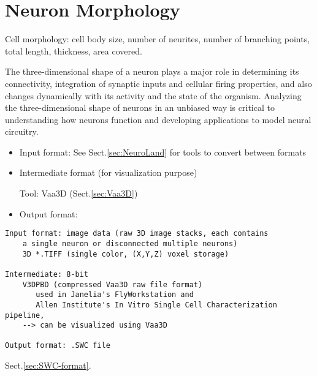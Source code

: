 \chapter{Neuron Morphology}
\label{chap:neuron-morphology}


Cell morphology: cell body size, number of neurites, number of branching
points, total length, thickness, area covered.

The three-dimensional shape of a neuron plays a major role in determining its
connectivity, integration of synaptic inputs and cellular firing properties, and
also changes dynamically with its activity and the state of the organism.
Analyzing the three-dimensional shape of neurons in an unbiased way is critical
to understanding how neurons function and developing applications to model
neural circuitry.

\begin{itemize}
  \item Input format: See Sect.\ref{sec:NeuroLand} for tools to convert between
  formats
  
  \item Intermediate format (for visualization purpose)
  
  Tool: Vaa3D (Sect.\ref{sec:Vaa3D})
  
  \item Output format:

\end{itemize}
\begin{verbatim}
Input format: image data (raw 3D image stacks, each contains
    a single neuron or disconnected multiple neurons)
    3D *.TIFF (single color, (X,Y,Z) voxel storage)
    
Intermediate: 8-bit 
    V3DPBD (compressed Vaa3D raw file format)
       used in Janelia's FlyWorkstation and 
       Allen Institute's In Vitro Single Cell Characterization pipeline,
    --> can be visualized using Vaa3D
    
Output format: .SWC file
\end{verbatim}
Sect.\ref{sec:SWC-format}.


